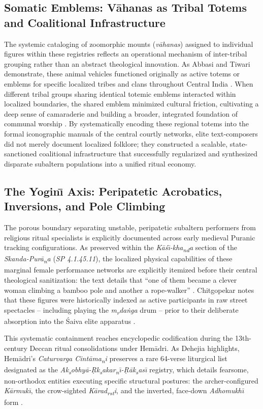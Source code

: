 \documentclass[11pt,twoside,letterpaper]{article}
\begin{document}
\subsection{Somatic Emblems: V\={a}hanas as Tribal Totems and Coalitional Infrastructure}
The systemic cataloging of zoomorphic mounts (\textit{v\={a}hanas}) assigned to individual figures within these registries reflects an operational mechanism of inter-tribal grouping rather than an abstract theological innovation. As Abbasi and Tiwari demonstrate, these animal vehicles functioned originally as active totems or emblems for specific localized tribes and clans throughout Central India \cite{Abbasi2001}. When different tribal groups sharing identical totemic emblems interacted within localized boundaries, the shared emblem minimized cultural friction, cultivating a deep sense of camaraderie and building a broader, integrated foundation of communal worship \cite{Abbasi2001}. By systematically encoding these regional totems into the formal iconographic manuals of the central courtly networks, elite text-composers did not merely document localized folklore; they constructed a scalable, state-sanctioned coalitional infrastructure that successfully regularized and synthesized disparate subaltern populations into a unified ritual economy.

\subsection{The Yogin\={\i} Axis: Peripatetic Acrobatics, Inversions, and Pole Climbing}
The porous boundary separating unstable, peripatetic subaltern performers from religious ritual specialists is explicitly documented across early medieval Puranic tracking configurations. As preserved within the \textit{K\={a}\'{s}\={\i}-kha\textsubscript{n}\textsubscript{d}a} section of the \textit{Skanda-Pur\={a}\textsubscript{n}a} (\textit{SP 4.1.45.11}), the localized physical capabilities of these marginal female performance networks are explicitly itemized before their central theological sanitization: the text details that ``one of them became a clever woman climbing a bamboo pole and another a rope-walker'' \cite{Shastri1991}. Chitgopekar notes that these figures were historically indexed as active participants in raw street spectacles -- including playing the \textit{m\textsubscript{r}da\.{n}ga} drum -- prior to their deliberate absorption into the Śaiva elite apparatus \cite{Chitgopekar2002}. 

This systematic containment reaches encyclopedic codification during the 13th-century Deccan ritual consolidations under Hem\={a}dri. As Dehejia highlights, Hem\={a}dri’s \textit{Caturvarga Cint\={a}ma\textsubscript{n}i} preserves a rare 64-verse liturgical list designated as the \textit{Ak\textsubscript{s}obhy\={a}-\d{R}k\textsubscript{s}akar\textsubscript{n}\={\i}-\d{R}\={a}k\textsubscript{s}as\={\i}} registry, which details fearsome, non-orthodox entities executing specific structural postures: the archer-configured \textit{K\={a}rmuk\={\i}}, the crow-sighted \textit{K\={a}rad\textsubscript{r}\textsubscript{s}\textsubscript{t}i}, and the inverted, face-down \textit{Adhomukh\={\i}} form \cite{Dehejia1986}. 
\end{document}
